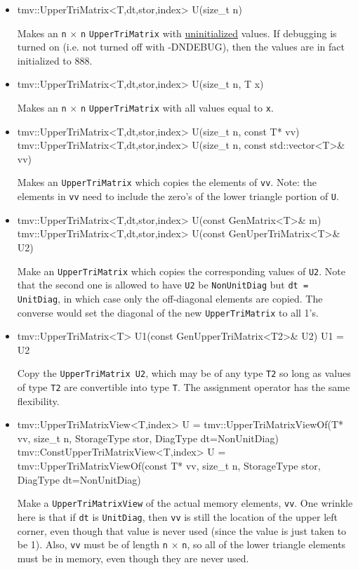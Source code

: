 \documentclass[twoside,letterpaper,11pt]{article}
\renewcommand{\tt}[1]{{\lstinline {#1}}}
\begin{document}
\begin{itemize}
\item 
\begin{tmvcode}
tmv::UpperTriMatrix<T,dt,stor,index> U(size_t n)
\end{tmvcode}
Makes an \tt{n} $\times$ \tt{n} \tt{UpperTriMatrix} with \underline{uninitialized} values.
If debugging is turned on (i.e. not turned off
with -DNDEBUG), then the values are in fact initialized to 888.  

\item
\begin{tmvcode}
tmv::UpperTriMatrix<T,dt,stor,index> U(size_t n, T x)
\end{tmvcode}
Makes an \tt{n} $\times$ \tt{n} \tt{UpperTriMatrix} with all values equal to \tt{x}.

\item
\begin{tmvcode}
tmv::UpperTriMatrix<T,dt,stor,index> U(size_t n, const T* vv)
tmv::UpperTriMatrix<T,dt,stor,index> U(size_t n, 
      const std::vector<T>& vv)
\end{tmvcode}
Makes an \tt{UpperTriMatrix} which copies the elements of \tt{vv}.
Note: the elements in \tt{vv} need to include the zero's of the lower triangle 
portion of \tt{U}.

\item 
\begin{tmvcode}
tmv::UpperTriMatrix<T,dt,stor,index> U(const GenMatrix<T>& m)
tmv::UpperTriMatrix<T,dt,stor,index> U(const GenUperTriMatrix<T>& U2)
\end{tmvcode}
Make an \tt{UpperTriMatrix} which copies the corresponding values of
\tt{U2}.  Note that the second one is allowed to have \tt{U2} be
\tt{NonUnitDiag} but \tt{dt = UnitDiag}, in which case only the 
off-diagonal elements are copied.  The converse would set the 
diagonal of the new \tt{UpperTriMatrix} to all 1's.

\item
\begin{tmvcode}
tmv::UpperTriMatrix<T> U1(const GenUpperTriMatrix<T2>& U2)
U1 = U2
\end{tmvcode}
Copy the \tt{UpperTriMatrix U2}, which may be of any type \tt{T2} so long
as values of type \tt{T2} are convertible into type \tt{T}.
The assignment operator has the same flexibility.

\item
\begin{tmvcode}
tmv::UpperTriMatrixView<T,index> U = 
      tmv::UpperTriMatrixViewOf(T* vv, size_t n, 
      StorageType stor, DiagType dt=NonUnitDiag)
tmv::ConstUpperTriMatrixView<T,index> U = 
      tmv::UpperTriMatrixViewOf(const T* vv, size_t n, 
      StorageType stor, DiagType dt=NonUnitDiag)
\end{tmvcode}
Make a \tt{UpperTriMatrixView} of the actual memory elements, \tt{vv}.
One wrinkle here is that if \tt{dt} is \tt{UnitDiag}, then 
\tt{vv} is still the location of the
upper left corner, even though that value is never used 
(since the value is just taken to
be 1).  Also, \tt{vv} must be of length \tt{n} $\times$ \tt{n},
so all of the lower triangle
elements must be in memory, even though they are never used.


\end{itemize}
\end{document}
